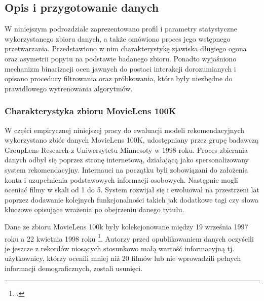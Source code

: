 \subsection{Opis i przygotowanie danych}

W niniejszym podrozdziale zaprezentowano profil i parametry statystyczne wykorzystanego zbioru danych, a także omówiono proces jego wstępnego przetwarzania. Przedstawiono w nim charakterystykę zjawiska długiego ogona oraz asymetrii popytu na podstawie badanego zbioru. Ponadto wyjaśniono mechanizm binarizacji ocen jawnych do postaci interakcji dorozumianych i opisano procedury filtrowania oraz próbkowania, które były niezbędne do prawidłowego wytrenowania algorytmów.

\subsubsection{Charakterystyka zbioru MovieLens 100K} %

W części empirycznej niniejszej pracy do ewaluacji modeli rekomendacyjnych wykorzystano zbiór danych MovieLens 100K, udostępniany przez grupę badawczą \foreignlanguage{english}{GroupLens Research} z Uniwersytetu Minnesoty w 1998 roku. Proces zbierania danych odbył się poprzez stronę internetową, działającą jako spersonalizowany system rekomendacyjny. Internauci na początku byli zobowiązani do założenia konta i uzupełnienia podstawowych informacji osobowych. Następnie mogli oceniać filmy w skali od 1 do 5. System rozwijał się i ewoluował na przestrzeni lat poprzez dodawanie kolejnych funkcjonalności takich jak dodatkowe tagi czy słowa kluczowe opisujące wrażenia po obejrzeniu danego tytułu.

Dane ze zbioru MovieLens 100k były kolekcjonowane między 19 września 1997 roku a 22 kwietnia 1998 roku \footcite{balchanowskiEwolucyjnaAgregacjaRang2023}. Autorzy przed opublikowaniem danych oczyścili je jeszcze z rekordów niosących stosunkowo małą wartość informacyjną tj. użytkownicy, którzy ocenili mniej niż 20 filmów lub nie wprowadzili pełnych informacji demograficznych, zostali usunięci.

